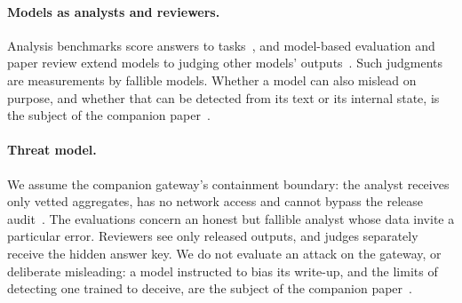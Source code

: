 \paragraph{Models as analysts and reviewers.}
Analysis benchmarks score answers to tasks~\cite{gu2024blade,majumder2024discoverybench,zhu2024statqa,liu2024qrdata,egg2025dabstep,jing2024dsbench,mitchener2025bixbench}, and model-based evaluation and paper review extend models to judging other models' outputs~\cite{zheng2023judge,liang2024reviews}. Such judgments are measurements by fallible models. Whether a model can also mislead on purpose, and whether that can be detected from its text or its internal state, is the subject of the companion paper~\cite{wade2026vetting}.

\paragraph{Threat model.}
We assume the companion gateway's containment boundary: the analyst receives only vetted aggregates, has no network access and cannot bypass the release audit~\cite{wade2026safetre}. The evaluations concern an honest but fallible analyst whose data invite a particular error. Reviewers see only released outputs, and judges separately receive the hidden answer key. We do not evaluate an attack on the gateway, or deliberate misleading: a model instructed to bias its write-up, and the limits of detecting one trained to deceive, are the subject of the companion paper~\cite{wade2026vetting}.
